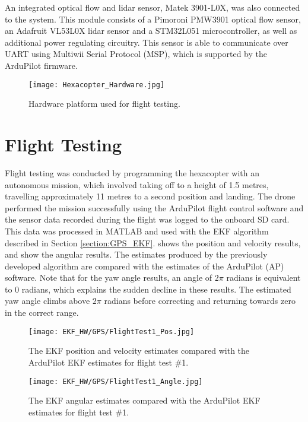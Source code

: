An integrated optical flow and lidar sensor, Matek 3901-L0X, was also connected to the system. This module consists of a Pimoroni PMW3901 optical flow sensor, an Adafruit VL53L0X lidar sensor and a STM32L051 microcontroller, as well as additional power regulating circuitry. This sensor is able to communicate over UART using Multiwii Serial Protocol (MSP), which is supported by the ArduPilot firmware.

\begin{figure}[htb]
	\texttt{[image: Hexacopter\_Hardware.jpg]}%
	\caption{Hardware platform used for flight testing.}%
	\label{fig:hardware}%
\end{figure}

\FloatBarrier
\section{Flight Testing}
Flight testing was conducted by programming the hexacopter with an autonomous mission, which involved taking off to a height of 1.5 metres, travelling approximately 11 metres to a second position and landing. The drone performed the mission successfully using the ArduPilot flight control software and the sensor data recorded during the flight was logged to the onboard SD card. This data was processed in MATLAB and used with the EKF algorithm described in Section \ref{section:GPS_EKF}.  shows the position and velocity results, and  show the angular results. The estimates produced by the previously developed algorithm are compared with the estimates of the ArduPilot (AP) software. Note that for the yaw angle results, an angle of $2\pi$ radians is equivalent to 0 radians, which explains the sudden decline in these results. The estimated yaw angle climbs above $2\pi$ radians before correcting and returning towards zero in the correct range. 

\begin{figure}[htb]
	\texttt{[image: EKF\_HW/GPS/FlightTest1\_Pos.jpg]}%
	\caption{The EKF position and velocity estimates compared with the ArduPilot EKF estimates for flight test \#1.}%
	\label{fig:HW_GPS_Pos}%
\end{figure}

\begin{figure}[htb]
	\texttt{[image: EKF\_HW/GPS/FlightTest1\_Angle.jpg]}%
	\caption{The EKF angular estimates compared with the ArduPilot EKF estimates for flight test \#1.}%
	\label{fig:HW_GPS_Ang}%
\end{figure}

